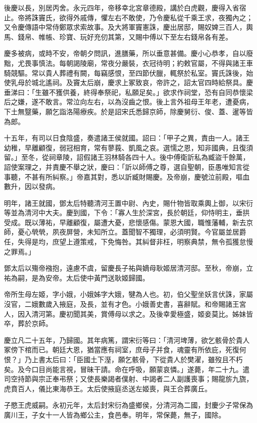\begin{pinyinscope}
後慶以長，別居丙舍。永元四年，帝移幸北宮章德殿，講於白虎觀，慶得入省宿止。帝將誅竇氏，欲得外戚傳，懼左右不敢使，乃令慶私從千乘王求，夜獨內之；又令慶傳語中常侍鄭眾求索故事。及大將軍竇憲誅，慶出居邸，賜奴婢三百人，輿馬、錢帛、帷帳、珍寶、玩好充仞其第，又賜中傅以下至左右錢帛各有差。

慶多被病，或時不安，帝朝夕問訊，進膳藥，所以垂意甚備。慶小心恭孝，自以廢黜，尤畏事慎法。每朝謁陵廟，常夜分嚴裝，衣冠待明；約敕官屬，不得與諸王車騎競驅。常以貴人葬禮有闕，每竊感恨，至四節伏臘，輒祭於私室。竇氏誅後，始使乳母於城北遙祠。及竇太后崩，慶求上冢致哀，帝許之，詔太官四時給祭具。慶垂涕曰：「生雖不獲供養，終得奉祭祀，私願足矣。」欲求作祠堂，恐有自同恭懷梁后之嫌，遂不敢言。常泣向左右，以為沒齒之恨。後上言外祖母王年老，遭憂病，下土無毉藥，願乞詣洛陽療疾。於是詔宋氏悉歸京師，除慶舅衍、俊、蓋、暹等皆為郎。

十五年，有司以日食陰盛，奏遣諸王侯就國。詔曰：「甲子之異，責由一人。諸王幼稚，早離顧復，弱冠相育，常有蓼莪、凱風之哀。選懦之恩，知非國典，且復須留。」至冬，從祠章陵，詔假諸王羽林騎各四十人。後中傅衛訢私為臧盜千餘萬，詔使案理之，并責慶不舉之狀，慶曰：「訢以師傅之尊，選自聖朝，臣愚唯知言從事聽，不甚有所糾察。」帝嘉其對，悉以訢臧財賜慶。及帝崩，慶號泣前殿，嘔血數升，因以發病。

明年，諸王就國，鄧太后特聽清河王置中尉、內史，賜什物皆取乘輿上御，以宋衍等並為清河中大夫。慶到國，下令：「寡人生於深宮，長於朝廷，仰恃明主，垂拱受成。既以薄祐，早離顧復，屬遭大憂，悲懷感傷。蒙恩大國，職惟藩輔，新去京師，憂心煢煢，夙夜屏營，未知所立。蓋聞智不獨理，必須明賢。今官屬並居爵任，失得是均，庶望上遵策戒，下免悔咎。其糾督非枉，明察典禁，無令孤獲怠慢之罪焉。」

鄧太后以殤帝襁抱，遠慮不虞，留慶長子祐與嫡母耿姬居清河邸。至秋，帝崩，立祐為嗣，是為安帝。太后使中黃門送耿姬歸國。

帝所生母左姬，字小娥，小娥姊字大娥，犍為人也。初，伯父聖坐妖言伏誅，家屬沒官，二娥數歲入掖庭，及長，並有才色。小娥善史書，喜辭賦。和帝賜諸王宮人，因入清河第。慶初聞其美，賞傅母以求之。及後幸愛極盛，姬妾莫比。姊妹皆卒，葬於京師。

慶立凡二十五年，乃歸國。其年病篤，謂宋衍等曰：「清河埤薄，欲乞骸骨於貴人冢傍下棺而已。朝廷大恩，猶當應有祠室，庶母子并食，魂靈有所依庇，死復何恨？」乃上書太后曰：「臣國土下溼，願乞骸骨，下從貴人於樊濯，雖歿且不朽矣。及今口目尚能言視，冒昧干請。命在呼吸，願蒙哀憐。」遂薨，年二十九。遣司空持節與宗正奉弔祭；又使長樂謁者僕射、中謁者二人副護喪事；賜龍旂九旒，虎賁百人，儀比東海恭王。太后使掖庭丞送左姬喪，與王合葬廣丘。

子愍王虎威嗣。永初元年，太后封宋衍為盛鄉侯，分清河為二國，封慶少子常保為廣川王，子女十一人皆為鄉公主，食邑奉。明年，常保薨，無子，國除。


\end{pinyinscope}

